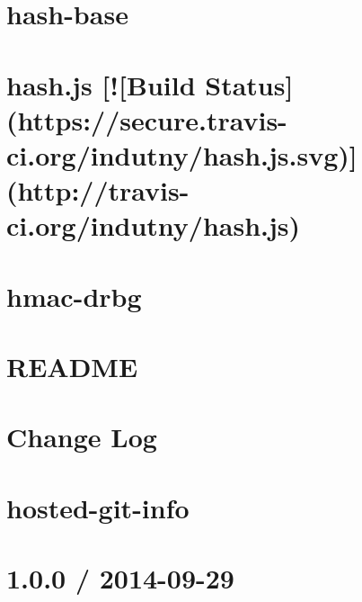 \documentclass[twoside]{book}
\newcommand{\+}{\discretionary{\mbox{\scriptsize$\hookleftarrow$}}{}{}}
\begin{document}
\chapter{hash-\/base}
\label{md_dsmacc_examples_DRmerge_node_modules_hash-base_README}

\chapter{hash.\+js \mbox{[}!\mbox{[}Build Status\mbox{]}(https\+://secure.travis-\/ci.org/indutny/hash.js.\+svg)\mbox{]}(http\+://travis-\/ci.org/indutny/hash.js)}
\label{md_dsmacc_examples_DRmerge_node_modules_hash_8js_README}

\chapter{hmac-\/drbg}
\label{md_dsmacc_examples_DRmerge_node_modules_hmac-drbg_README}

\chapter{R\+E\+A\+D\+ME}
\label{md_dsmacc_examples_DRmerge_node_modules_home-path_README}

\chapter{Change Log}
\label{md_dsmacc_examples_DRmerge_node_modules_hosted-git-info_CHANGELOG}

\chapter{hosted-\/git-\/info}
\label{md_dsmacc_examples_DRmerge_node_modules_hosted-git-info_README}

\chapter{1.0.0 / 2014-\/09-\/29}
\label{md_dsmacc_examples_DRmerge_node_modules_htmlescape_CHANGELOG}

\end{document}
